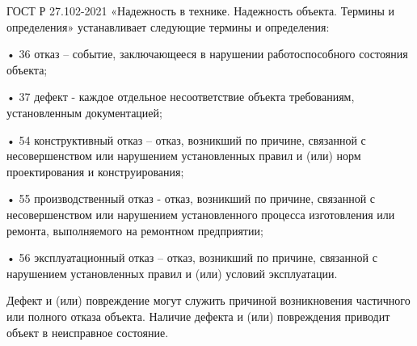 ГОСТ Р 27.102-2021 «Надежность в технике. Надежность объекта. Термины и определения» \cite{271022021:gost} устанавливает следующие термины и определения:



• 36 отказ – событие, заключающееся в нарушении работоспособного состояния объекта;

• 37 дефект - каждое отдельное несоответствие объекта требованиям, установленным документацией;

• 54 конструктивный отказ –  отказ, возникший по причине, связанной с несовершенством или нарушением установленных правил и (или) норм проектирования и конструирования;

• 55 производственный отказ - отказ, возникший по причине, связанной с несовершенством или нарушением установленного процесса изготовления или ремонта, выполняемого на ремонтном предприятии; 

• 56 эксплуатационный отказ –  отказ, возникший по причине, связанной с нарушением установленных правил и (или) условий эксплуатации.


Дефект и (или) повреждение могут служить причиной возникновения частичного или полного отказа объекта. Наличие дефекта и (или) повреждения приводит объект в неисправное состояние.

